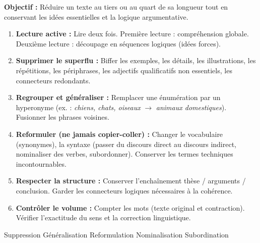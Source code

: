 \documentclass[11pt]{article}
\newcommand{\cle}[1]{{\popxbold\color{popdark}#1}}
\begin{document}
\begin{methode}
\textbf{Objectif :} Réduire un texte au tiers ou au quart de sa longueur tout en conservant les idées essentielles et la logique argumentative.
\begin{enumerate}
    \item \textbf{Lecture active :} Lire deux fois. Première lecture : compréhension globale. Deuxième lecture : découpage en séquences logiques (idées forces).
    \item \textbf{Supprimer le superflu :} Biffer les exemples, les détails, les illustrations, les répétitions, les périphrases, les adjectifs qualificatifs non essentiels, les connecteurs redondants.
    \item \textbf{Regrouper et généraliser :} Remplacer une énumération par un hyperonyme (ex. : \emph{chiens, chats, oiseaux} $\to$ \emph{animaux domestiques}). Fusionner les phrases voisines.
    \item \textbf{Reformuler (ne jamais copier-coller) :} Changer le vocabulaire (synonymes), la syntaxe (passer du discours direct au discours indirect, nominaliser des verbes, subordonner). Conserver les termes techniques incontournables.
    \item \textbf{Respecter la structure :} Conserver l'enchaînement thèse / arguments / conclusion. Garder les connecteurs logiques nécessaires à la cohérence.
    \item \textbf{Contrôler le volume :} Compter les mots (texte original et contraction). Vérifier l'exactitude du sens et la correction linguistique.
\end{enumerate}
\cle{Suppression} \cle{Généralisation} \cle{Reformulation} \cle{Nominalisation} \cle{Subordination}
\end{methode}
\end{document}
